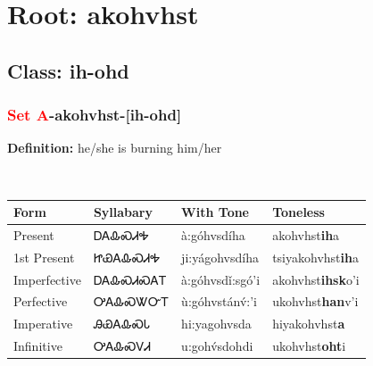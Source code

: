 \needspace{4in}
\section*{Root: akohvhst}
\nopagebreak
{}
\needspace{3in}
\subsection*{Class: ih-ohd}
\nopagebreak
\needspace{2in}
\subsubsection*{\textcolor{Red}{Set A}{-}\textbf{akohvhst}{-}[ih-ohd]}
\nopagebreak
\textbf{Definition: } he/she is burning him/her
\\[0.5em]
\begin{tabularx}{\textwidth}{l X X X}%
\toprule%
\textbf{Form}&\textbf{Syllabary}&\textbf{With Tone}&\textbf{Toneless}\\%
\midrule%
Present&ᎠᎪᎲᏍᏗᎭ&à:góhvsdíha&akohvhst\textbf{ih}a\\%
1st Present&ᏥᏯᎪᎲᏍᏗᎭ&ji:yágohvsdíha&tsiyakohvhst\textbf{ih}a\\%
Imperfective&ᎠᎪᎲᏍᏗᏍᎪᎢ&à:góhvsdǐ:sgó’i&akohvhst\textbf{ihsk}o'i\\%
Perfective&ᎤᎪᎲᏍᏔᏅᎢ&ù:góhvstánv́:’i&ukohvhst\textbf{han}v'i\\%
Imperative&ᎯᏯᎪᎲᏍᏓ&hi:yagohvsda&hiyakohvhst\textbf{a}\\%
Infinitive&ᎤᎪᎲᏍᏙᏗ&u:gohv́sdohdi&ukohvhst\textbf{oht}i\\%
\bottomrule%
\end{tabularx}
\\[1em]